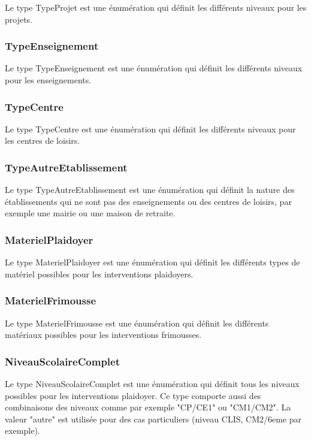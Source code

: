 Le type TypeProjet est une énumération qui définit les différents niveaux pour les projets.

\subsubsection*{TypeEnseignement}

Le type TypeEnseignement est une énumération qui définit les différents niveaux pour les enseignements.

\subsubsection*{TypeCentre}

Le type TypeCentre est une énumération qui définit les différents niveaux pour les centres de loisirs.

\subsubsection*{TypeAutreEtablissement}

Le type TypeAutreEtablissement est une énumération qui définit la nature des établissements qui ne sont pas des enseignements ou des centres de loisirs, par exemple une mairie ou une maison de retraite.

\subsubsection*{MaterielPlaidoyer}

Le type MaterielPlaidoyer est une énumération qui définit les différents types de matériel possibles pour les interventions plaidoyers.

\subsubsection*{MaterielFrimousse}

Le type MaterielFrimousse est une énumération qui définit les différents matériaux possibles pour les interventions frimousses.

\subsubsection*{NiveauScolaireComplet}

Le type NiveauScolaireComplet est une énumération qui définit tous les niveaux possibles pour les interventions plaidoyer. Ce type comporte aussi des combinaisons des niveaux comme par exemple "CP/CE1" ou "CM1/CM2". La valeur "autre" est utilisée pour des cas particuliers (niveau CLIS, CM2/6eme par exemple).

